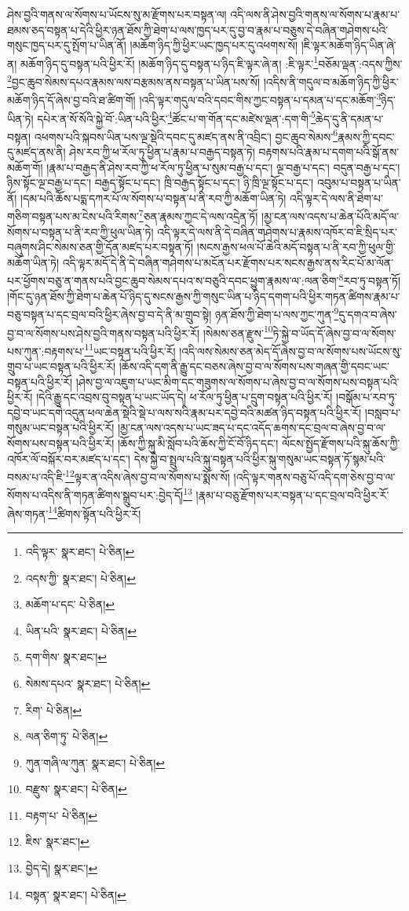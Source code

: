 ཤེས་བྱའི་གནས་ལ་སོགས་པ་ཡོངས་སུ་མ་རྫོགས་པར་བསྟན་ལ། འདི་ལས་ནི་ཤེས་བྱའི་གནས་ལ་སོགས་པ་རྣམ་པ་ཐམས་ཅད་བསྟན་པ་དེའི་ཕྱིར་ཉན་ཐོས་ཀྱི་ཐེག་པ་ལས་ཁྱད་པར་དུ་བྱ་བ་རྣམ་པ་བཅུས་དེ་བཞིན་གཤེགས་པའི་གསུང་ཁྱད་པར་དུ་སྤོག་པ་ཡིན་ནོ། །མཆོག་ཉིད་ཀྱི་ཕྱིར་ཡང་ཁྱད་པར་དུ་འཕགས་སོ། །ཇི་ལྟར་མཆོག་ཉིད་ཡིན་ཞེ་ན། མཆོག་ཉིད་དུ་བསྟན་པའི་ཕྱིར་རོ། །མཆོག་ཉིད་དུ་བསྟན་པ་ཉིད་ཇི་ལྟར་ཞེ་ན། :ཇི་ལྟར་\footnote{འདི་ལྟར་  སྣར་ཐང་།  པེ་ཅིན། }བཅོམ་ལྡན་:འདས་ཀྱིས་\footnote{འདས་ཀྱི་  སྣར་ཐང་།  པེ་ཅིན། }བྱང་ཆུབ་སེམས་དཔའ་རྣམས་ལས་བརྩམས་ནས་བསྟན་པ་ཡིན་པས་སོ། །འདིས་ནི་གདུལ་བ་མཆོག་ཉིད་ཀྱི་ཕྱིར་མཆོག་ཉིད་དོ་ཞེས་བྱ་བའི་ཐ་ཚིག་གོ། །འདི་ལྟར་གདུལ་བའི་དབང་གིས་ཀྱང་བསྟན་པ་དམན་པ་དང་མཆོག་\footnote{མཆོག་པ་དང་  པེ་ཅིན། }ཉིད་ཡིན་ཏེ། དཔེར་ན་སོ་སོའི་སྐྱེ་བོ་:ཡིན་པའི་ཕྱིར་\footnote{ཡིན་པའི་  སྣར་ཐང་།  པེ་ཅིན། }ཚོང་པ་ག་གོན་དང་མཛེས་ལྡན་:དག་གི་\footnote{དག་གིས་  སྣར་ཐང་། }ཆེད་དུ་ནི་དམན་པ་བསྟན། འཕགས་པའི་སྐབས་ཡིན་པས་ལྔ་སྡེའི་དབང་དུ་མཛད་ནས་ནི་འབྲིང་། བྱང་ཆུབ་སེམས་\footnote{སེམས་དཔའ་  སྣར་ཐང་།  པེ་ཅིན། }རྣམས་ཀྱི་དབང་དུ་མཛད་ནས་ནི། ཤེས་རབ་ཀྱི་ཕ་རོལ་ཏུ་ཕྱིན་པ་རྣམ་པ་བརྒྱད་བསྟན་ཏེ། བརྟགས་པའི་རྣམ་པ་དགག་པའི་སྒོ་ནས་མཆོག་གོ། །རྣམ་པ་བརྒྱད་ནི་ཤེས་རབ་ཀྱི་ཕ་རོལ་ཏུ་ཕྱིན་པ་སུམ་བརྒྱ་པ་དང་། ལྔ་བརྒྱ་པ་དང་། བདུན་བརྒྱ་པ་དང་། ཉིས་སྟོང་ལྔ་བརྒྱ་པ་དང་། བརྒྱད་སྟོང་པ་དང་། ཁྲི་བརྒྱད་སྟོང་པ་དང་། ཉི་ཁྲི་ལྔ་སྟོང་པ་དང་། འབུམ་པ་བསྟན་པ་ཡིན་ནོ། །དམ་པའི་ཆོས་པདྨ་དཀར་པོ་ལ་སོགས་པ་བསྟན་པ་ནི་རབ་ཀྱི་མཆོག་ཡིན་ཏེ། འདི་ལྟར་དེ་ལས་ནི་ཐེག་པ་གཅིག་བསྟན་པས་མ་ངེས་པའི་རིགས་\footnote{རིག་  པེ་ཅིན། }ཅན་རྣམས་ཀྱང་དེ་ལས་འདྲེན་ཏོ། །མྱ་ངན་ལས་འདས་པ་ཆེན་པོའི་མདོ་ལ་སོགས་པ་བསྟན་པ་ནི་རབ་ཀྱི་ཕུལ་ཡིན་ཏེ། འདི་ལྟར་དེ་ལས་ནི་དེ་བཞིན་གཤེགས་པ་རྣམས་འཁོར་བ་ཇི་སྲིད་པར་བཞུགས་ཤིང་སེམས་ཅན་གྱི་དོན་མཛད་པར་བསྟན་ཏོ། །སངས་རྒྱས་ཕལ་པོ་ཆེའི་མདོ་བསྟན་པ་ནི་རབ་ཀྱི་ཕུལ་གྱི་མཆོག་ཡིན་ཏེ། འདི་ལྟར་མདོ་དེ་ནི་དེ་བཞིན་གཤེགས་པ་མངོན་པར་རྫོགས་པར་སངས་རྒྱས་ནས་རིང་པོ་མ་ལོན་པར་ཕྱོགས་བཅུ་ན་གནས་པའི་བྱང་ཆུབ་སེམས་དཔའ་ས་བཅུའི་དབང་ཕྱུག་རྣམས་ལ་:ལན་ཅིག་\footnote{ལན་ཅིག་ཏུ་  པེ་ཅིན། }རབ་ཏུ་བསྟན་ཏོ། །གོང་དུ་ཉན་ཐོས་ཀྱི་ཐེག་པ་ཆེན་པོ་ཉིད་དུ་སངས་རྒྱས་ཀྱི་གསུང་ཡིན་པ་ཉིད་དགག་པའི་ཕྱིར་གཏན་ཚིགས་རྣམ་པ་བཅུ་བསྟན་པ་དང་བྲལ་བའི་ཕྱིར་ཞེས་བྱ་བ་དེ་ནི་མ་གྲུབ་སྟེ། ཉན་ཐོས་ཀྱི་ཐེག་པ་ལས་ཀྱང་ཀུན་\footnote{ཀུན་གཞི་ལ་ཀུན་  སྣར་ཐང་།  པེ་ཅིན། }དུ་དགའ་བ་ཞེས་བྱ་བ་ལ་སོགས་པས་ཤེས་བྱའི་གནས་བསྟན་པའི་ཕྱིར་རོ། །སེམས་ཅན་རྫུས་\footnote{བརྫུས་  སྣར་ཐང་།  པེ་ཅིན། }ཏེ་སྐྱེ་བ་ཡོད་དོ་ཞེས་བྱ་བ་ལ་སོགས་པས་ཀུན་:བརྟགས་པ་\footnote{བརྟག་པ་  པེ་ཅིན། }ཡང་བསྟན་པའི་ཕྱིར་རོ། །འདི་ལས་སེམས་ཅན་མེད་དོ་ཞེས་བྱ་བ་ལ་སོགས་པས་ཡོངས་སུ་གྲུབ་པ་ཡང་བསྟན་པའི་ཕྱིར་རོ། །ཆོས་འདི་དག་ནི་རྒྱུ་དང་བཅས་ཞེས་བྱ་བ་ལ་སོགས་པས་གཞན་གྱི་དབང་ཡང་བསྟན་པའི་ཕྱིར་རོ། །ཤེས་བྱ་ལ་འཇུག་པ་ཡང་མིག་དང་གཟུགས་ལ་སོགས་པ་ཞེས་བྱ་བ་ལ་སོགས་པས་བསྟན་པའི་ཕྱིར་རོ། །དེའི་རྒྱུ་དང་འབྲས་བུ་བསྟན་པ་ཡང་ཡོད་དེ། ཕ་རོལ་ཏུ་ཕྱིན་པ་དྲུག་བསྟན་པའི་ཕྱིར་རོ། །བསྒོམ་པ་རབ་ཏུ་དབྱེ་བ་ཡང་དགེ་འདུན་ཕལ་ཆེན་སྡེའི་སྡེ་པ་ལས་སའི་རྣམ་པར་དབྱེ་བའི་མཚན་ཉིད་བསྟན་པའི་ཕྱིར་རོ། །བསླབ་པ་གསུམ་ཡང་བསྟན་པའི་ཕྱིར་རོ། །མྱ་ངན་ལས་འདས་པ་ཡང་ཟད་པ་དང་འདོད་ཆགས་དང་བྲལ་བ་ཞེས་བྱ་བ་ལ་སོགས་པས་བསྟན་པའི་ཕྱིར་རོ། །ཆོས་ཀྱི་སྐུ་མི་སློབ་པའི་ཆོས་ཀྱི་ངོ་བོ་ཉིད་དང་། ལོངས་སྤྱོད་རྫོགས་པའི་སྐུ་ཆོས་ཀྱི་འཁོར་ལོ་བསྐོར་བར་མཛད་པ་དང་། དེས་སྐྱེ་བ་སྤྲུལ་པའི་སྐུ་བསྟན་པའི་ཕྱིར་སྐུ་གསུམ་ཡང་བསྟན་ཏོ་སྙམ་པའི་བསམ་པ་འདི་ཇི་\footnote{ཇིས་  སྣར་ཐང་། }ལྟར་ན་འདིས་ཞེས་བྱ་བ་ལ་སོགས་པ་སྨོས་སོ། །འདི་ལྟར་གནས་བཅུ་པོ་འདི་དག་ཅེས་བྱ་བ་ལ་སོགས་པ་འདིས་ནི་གཏན་ཚིགས་སྒྲུབ་པར་:བྱེད་དོ།\footnote{བྱེད་དེ།  སྣར་ཐང་། } །རྣམ་པ་བཅུ་རྫོགས་པར་བསྟན་པ་དང་བྲལ་བའི་ཕྱིར་རོ་ཞེས་གཏན་\footnote{བསྟན་  སྣར་ཐང་།  པེ་ཅིན། }ཚིགས་སྟོན་པའི་ཕྱིར་རོ། 